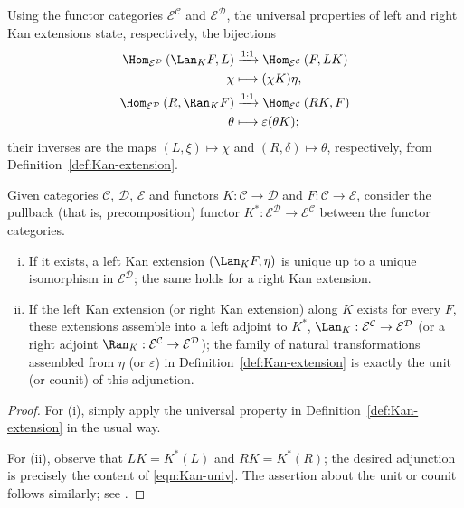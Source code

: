 Using the functor categories $\mathcal{E}^{\mathcal{C}}$ and
$\mathcal{E}^{\mathcal{D}}$, the universal properties of left and right Kan
extensions state, respectively, the bijections
\begin{equation}\label{eqn:Kan-univ}\begin{aligned}
	\Hom_{\mathcal{E}^{\mathcal{D}}}\left( \Lan_K F, L \right) & \xrightarrow{1:1} \Hom_{\mathcal{E}^{\mathcal{C}}}\left( F, LK \right) \\
	\chi & \longmapsto (\chi K)\eta , \\
	\Hom_{\mathcal{E}^{\mathcal{D}}}\left( R, \Ran_K F \right) & \xrightarrow{1:1} \Hom_{\mathcal{E}^{\mathcal{C}}}\left( RK, F \right) \\
	\theta & \longmapsto \varepsilon (\theta K);
\end{aligned}\end{equation}
their inverses are the maps $(L, \xi) \mapsto \chi$ and
$(R, \delta) \mapsto \theta$, respectively, from
Definition~\ref{def:Kan-extension}.

\begin{proposition}\label{prop:Kan-uniqueness}
	Given categories $\mathcal{C}$, $\mathcal{D}$, $\mathcal{E}$ and functors
	$K: \mathcal{C} \to \mathcal{D}$ and $F: \mathcal{C} \to \mathcal{E}$,
	consider the pullback (that is, precomposition) functor
	$K^*: \mathcal{E}^{\mathcal{D}} \to \mathcal{E}^{\mathcal{C}}$ between
	the functor categories.
	\begin{enumerate}[(i)]
		\item If it exists, a left Kan extension $(\Lan_K F, \eta)$ is unique up
		to a unique isomorphism in $\mathcal{E}^{\mathcal{D}}$; the same holds for
		a right Kan extension.
		\item If the left Kan extension (or right Kan extension) along $K$ exists
		for every $F$, these extensions assemble into a left adjoint to $K^*$,
		$\Lan_K: \mathcal{E}^{\mathcal{C}} \to \mathcal{E}^{\mathcal{D}}$
		(or a right adjoint
		$\Ran_K: \mathcal{E}^{\mathcal{C}} \to \mathcal{E}^{\mathcal{D}}$);
		the family of natural transformations assembled from $\eta$ (or
		$\varepsilon$) in Definition~\ref{def:Kan-extension} is exactly the unit
		(or counit) of this adjunction.
	\end{enumerate}
\end{proposition}
\begin{proof}
	For (i), simply apply the universal property in
	Definition~\ref{def:Kan-extension} in the usual way.

	For (ii), observe that $LK = K^*(L)$ and $RK = K^*(R)$; the desired
	adjunction is precisely the content of \eqref{eqn:Kan-univ}. The assertion
	about the unit or counit follows similarly; see
	\cite[Proposition 2.6.5]{Li1}.
\end{proof}


